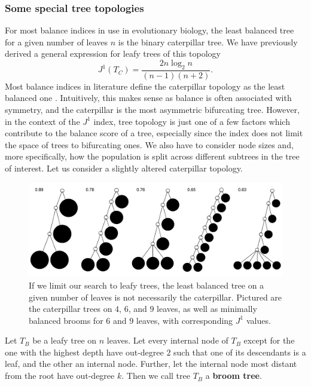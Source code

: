 \subsubsection{Some special tree topologies}
For most balance indices in use in evolutionary biology, the least balanced tree for a given number of leaves $n$ is the binary caterpillar tree. We have previously derived a general expression for leafy trees of this topology \cite{lemant_robust_2021}
\begin{equation}
    J^1(T_C) = \frac{2n\log_2n}{(n-1)(n+2)}.\label{caterpillar}
\end{equation}
Most balance indices in literature define the caterpillar topology as the least balanced one \cite{fischer_tree_2021}. Intuitively, this makes sense as balance is often associated with symmetry, and the caterpillar is the most asymmetric bifurcating tree. However, in the context of the $J^1$ index, tree topology is just one of a few factors which contribute to the balance score of a tree, especially since the index does not limit the space of trees to bifurcating ones. We also have to consider node sizes and, more specifically, how the population is split across different subtrees in the tree of interest. Let us consider a slightly altered caterpillar topology.
\par
\begin{figure}
    \centering
    \includegraphics[width=\textwidth]{Chapter_2/figures/example_figure_1.pdf}
    \caption{If we limit our search to leafy trees, the least balanced tree on a given number of leaves is not necessarily the caterpillar. Pictured are the caterpillar trees on $4$, $6$, and $9$ leaves, as well as minimally balanced brooms for $6$ and $9$ leaves, with corresponding $J^1$ values.}
    \label{example_figure_1}
\end{figure}

\begin{definition}
    Let $T_B$ be a leafy tree on $n$ leaves. Let every internal node of $T_B$ except for the one with the highest depth have out-degree $2$ such that one of its descendants is a leaf, and the other an internal node. Further, let the internal node most distant from the root have out-degree $k$. Then we call tree $T_B$ a \textbf{broom tree}.
\end{definition}

